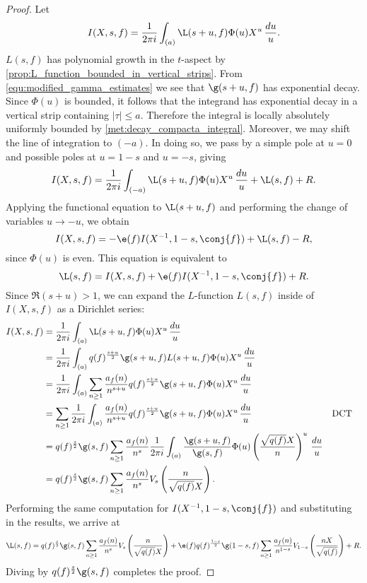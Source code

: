     \begin{proof}
      Let
      \[
        I(X,s,f) = \frac{1}{2\pi i}\int_{(a)}\L(s+u,f)\Phi(u)X^{u}\,\frac{du}{u}.
      \]
      $L(s,f)$ has polynomial growth in the $t$-aspect by \cref{prop:L_function_bounded_in_vertical_strips}. From \cref{equ:modified_gamma_estimates} we see that $\g(s+u,f)$ has exponential decay. Since $\Phi(u)$ is bounded, it follows that the integrand has exponential decay in a vertical strip containing $|\tau| \le a$. Therefore the integral is locally absolutely uniformly bounded by \cref{met:decay_compacta_integral}. Moreover, we may shift the line of integration to $(-a)$. In doing so, we pass by a simple pole at $u = 0$ and possible poles at $u = 1-s$ and $u = -s$, giving
      \[
        I(X,s,f) = \frac{1}{2\pi i}\int_{(-a)}\L(s+u,f)\Phi(u)X^{u}\,\frac{du}{u}+\L(s,f)+R.
      \]
      Applying the functional equation to $\L(s+u,f)$ and performing the change of variables $u \to -u$, we obtain
      \[
        I(X,s,f) = -\e(f)I(X^{-1},1-s,\conj{f})+\L(s,f)-R,
      \]
      since $\Phi(u)$ is even. This equation is equivalent to
      \[
        \L(s,f) = I(X,s,f)+\e(f)I(X^{-1},1-s,\conj{f})+R.
      \]
      Since $\Re(s+u) > 1$, we can expand the $L$-function $L(s,f)$ inside of $I(X,s,f)$ as a Dirichlet series:
      \begin{align*}
        I(X,s,f) &= \frac{1}{2\pi i}\int_{(a)}\L(s+u,f)\Phi(u)X^{u}\,\frac{du}{u} \\
        &= \frac{1}{2\pi i}\int_{(a)}q(f)^{\frac{s+u}{2}}\g(s+u,f)L(s+u,f)\Phi(u)X^{u}\,\frac{du}{u} \\
        &= \frac{1}{2\pi i}\int_{(a)}\sum_{n \ge 1}\frac{a_{f}(n)}{n^{s+u}}q(f)^{\frac{s+u}{2}}\g(s+u,f)\Phi(u)X^{u}\,\frac{du}{u} \\
        &= \sum_{n \ge 1}\frac{1}{2\pi i}\int_{(a)}\frac{a_{f}(n)}{n^{s+u}}q(f)^{\frac{s+u}{2}}\g(s+u,f)\Phi(u)X^{u}\,\frac{du}{u} && \text{DCT} \\
        &= q(f)^{\frac{s}{2}}\g(s,f)\sum_{n \ge 1}\frac{a_{f}(n)}{n^{s}}\frac{1}{2\pi i}\int_{(a)}\frac{\g(s+u,f)}{\g(s,f)}\Phi(u)\left(\frac{\sqrt{q(f)}X}{n}\right)^{u}\,\frac{du}{u} \\
        &= q(f)^{\frac{s}{2}}\g(s,f)\sum_{n \ge 1}\frac{a_{f}(n)}{n^{s}}V_{s}\left(\frac{n}{\sqrt{q(f)}X}\right).
      \end{align*}
      Performing the same computation for $I(X^{-1},1-s,\conj{f})$ and substituting in the results, we arrive at
      \[
        \L(s,f) = q(f)^{\frac{s}{2}}\g(s,f)\sum_{n \ge 1}\frac{a_{f}(n)}{n^{s}}V_{s}\left(\frac{n}{\sqrt{q(f)}X}\right)+\e(f)q(f)^{\frac{1-s}{2}}\g(1-s,f)\sum_{n \ge 1}\frac{a_{f}(n)}{n^{1-s}}V_{1-s}\left(\frac{nX}{\sqrt{q(f)}}\right)+R.
      \]
      Diving by $q(f)^{\frac{s}{2}}\g(s,f)$ completes the proof.
    \end{proof}

